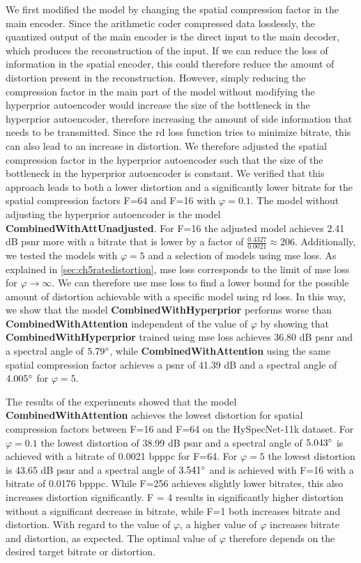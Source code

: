 We first modified the model by changing the spatial compression factor in the main encoder. Since the arithmetic coder compressed data losslessly, the quantized output of the main encoder is the direct input to the main decoder, which produces the reconstruction of the input. If we can reduce the loss of information in the spatial encoder, this could therefore reduce the amount of distortion present in the reconstruction. However, simply reducing the compression factor in the main part of the model without modifying the hyperprior autoencoder would increase the size of the bottleneck in the hyperprior autoencoder, therefore increasing the amount of side information that needs to be transmitted. Since the \ac{rd} loss function tries to minimize bitrate, this can also lead to an increase in distortion. We therefore adjusted the spatial compression factor in the hyperprior autoencoder such that the size of the bottleneck in the hyperprior autoencoder is constant. We verified that this approach leads to both a lower distortion and a significantly lower bitrate for the spatial compression factors F=64 and F=16 with $\varphi=0.1$. The model without adjusting the hyperprior autoencoder is the model \textbf{CombinedWithAttUnadjusted}. For F=16 the adjusted model achieves 2.41 dB \ac{psnr} more with a bitrate that is lower by a factor of $\frac{0.4327}{0.0021} \approx 206$. Additionally, we tested the models with $\varphi=5$ and a selection of models using \ac{mse} loss. As explained in \autoref{sec:ch5ratedistortion}, \ac{mse} loss corresponds to the limit of \ac{mse} loss for $\varphi\rightarrow\infty$. We can therefore use \ac{mse} loss to find a lower bound for the possible amount of distortion achievable with a specific model using \ac{rd} loss. In this way, we show that the model \textbf{CombinedWithHyperprior} performs worse than \textbf{CombinedWithAttention} independent of the value of $\varphi$ by showing that \textbf{CombinedWithHyperprior} trained using \ac{mse} loss achieves 36.80 dB \ac{psnr} and a spectral angle of $5.79 \degree$, while \textbf{CombinedWithAttention} using the same spatial compression factor achieves a \ac{psnr} of 41.39 dB and a spectral angle of $4.005 \degree$ for $\varphi=5$.

The results of the experiments showed that the model \textbf{CombinedWithAttention} achieves the lowest distortion for spatial compression factors between F=16 and F=64 on the HySpecNet-11k dataset. For $\varphi=0.1$ the lowest distortion of 38.99 dB \ac{psnr} and a spectral angle of $5.043 \degree$ is achieved with a bitrate of 0.0021 \ac{bpppc} for F=64. For $\varphi=5$ the lowest distortion is 43.65 dB \ac{psnr} and a spectral angle of $3.541 \degree$ and is achieved with F=16 with a bitrate of 0.0176 \ac{bpppc}. While F=256 achieves slightly lower bitrates, this also increases distortion significantly. F = 4 results in significantly higher distortion without a significant decrease in bitrate, while F=1 both increases bitrate and distortion. With regard to the value of $\varphi$, a higher value of $\varphi$ increases bitrate and distortion, as expected. The optimal value of $\varphi$ therefore depends on the desired target bitrate or distortion. 

